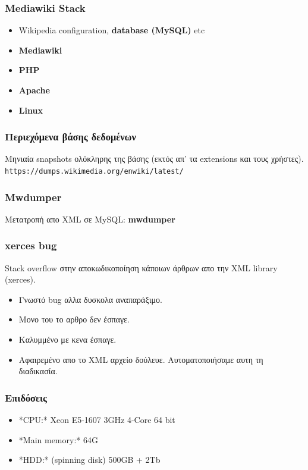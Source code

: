 \documentclass[bigger]{beamer}
\begin{document}
\begin{frame}
  \frametitle{Mediawiki Stack}

  \begin{itemize}
  \item Wikipedia configuration, \textbf<2>{database (MySQL)} etc
  \item \textbf<2>{Mediawiki}
  \item \textbf<2>{PHP}
  \item \textbf<2>{Apache}
  \item \textbf<2>{Linux}
  \end{itemize}
  \vfill
  \vfill
\end{frame}

\begin{frame}
  \frametitle{Περιεχόμενα βάσης δεδομένων}

  Μηνιαία snapshots ολόκληρης της βάσης (εκτός απ' τα extensions και
  τους χρήστες).
  \vfill
  \texttt{https://dumps.wikimedia.org/enwiki/latest/} \vfill
\end{frame}

\begin{frame}
  \frametitle{Mwdumper}

  Μετατροπή απο XML σε MySQL: \bf{mwdumper}
\end{frame}

\begin{frame}
  \frametitle{xerces bug} Stack overflow στην αποκωδικοποίηση κάποιων
  άρθρων απο την XML library (xerces).
  \vfill
  \begin{itemize}
  \item<2-> Γνωστό bug αλλα δυσκολα αναπαράξιμο.
  \item<3-> Μονο του το αρθρο δεν έσπαγε.
  \item<4-> Καλυμμένο με κενα έσπαγε.
  \item<5-> Αφαιρεμένο απο το XML αρχείο δούλευε.
    Αυτοματοποιήσαμε αυτη τη διαδικασία.
  \end{itemize}
\end{frame}


\begin{frame}
  \frametitle{Επιδόσεις}
  \begin{itemize}
  \item *CPU:* Xeon E5-1607 3GHz 4-Core 64 bit
  \item *Main memory:* 64G
  \item  *HDD:* (spinning disk) 500GB + 2Tb
  \end{itemize}
\end{frame}
\end{document}
